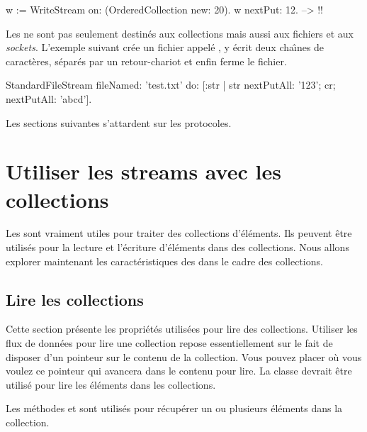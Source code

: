 \documentclass[a4paper,10pt,twoside]{book}
\begin{document}
\begin{code}{}
w := WriteStream on: (OrderedCollection new: 20).
w nextPut: 12. -->  !!
\end{code}

Les \streams ne sont pas seulement destin\'es aux collections mais
aussi aux fichiers et aux \emph{sockets}.
L'exemple suivant cr\'ee un fichier appel\'e , 
y \'ecrit deux cha\^{\i}nes de caract\`eres, s\'epar\'es par un retour-chariot et enfin ferme le fichier.

\begin{code}{}
StandardFileStream
  fileNamed: 'test.txt'
  do: [:str | str
                nextPutAll: '123';
                cr;
                nextPutAll: 'abcd'].
\end{code}

Les sections suivantes s'attardent sur les protocoles.

\section{Utiliser les streams avec les collections}

Les \streams sont vraiment utiles pour traiter des collections d'\'el\'ements.
Ils peuvent \^etre utilis\'es pour la lecture et l'\'ecriture d'\'el\'ements
dans des collections. Nous allons explorer maintenant les caract\'eristiques
des \streams dans le cadre des collections.

\subsection{Lire les collections}

Cette section pr\'esente les propri\'et\'es utilis\'ees pour lire des collections. Utiliser les flux de donn\'ees pour lire une collection 
repose essentiellement sur le fait de disposer d'un pointeur sur le contenu de la collection.
Vous pouvez placer o\`u vous voulez ce pointeur qui avancera dans le contenu pour lire.
La classe  devrait \^etre utilis\'e pour lire les \'el\'ements dans les collections.

Les m\'ethodes  et  
sont utilis\'es pour r\'ecup\'erer un ou plusieurs \'el\'ements dans
la collection.
\end{document}
